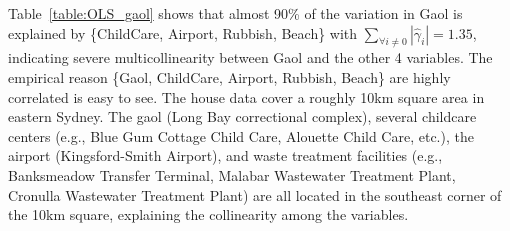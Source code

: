 \documentclass[11pt,review,authoryear]{elsarticle}
\begin{document}
Table~\ref{table:OLS_gaol} shows that almost 90\% of the variation in Gaol is explained by \{ChildCare, Airport, Rubbish, Beach\} with $\sum_{\forall i \neq 0} \left\vert \hat{\gamma}_i \right\vert = 1.35$, indicating severe multicollinearity between Gaol and the other 4 variables. The empirical reason \{Gaol, ChildCare, Airport, Rubbish, Beach\} are highly correlated is easy to see. The house data cover a roughly 10km square area in eastern Sydney. The gaol (Long Bay correctional complex), several childcare centers (e.g., Blue Gum Cottage Child Care, Alouette Child Care, etc.), the airport (Kingsford-Smith Airport), and waste treatment facilities (e.g., Banksmeadow Transfer Terminal, Malabar Wastewater Treatment Plant, Cronulla Wastewater Treatment Plant) are all located in the southeast corner of the 10km square, explaining the collinearity among the variables.
\end{document}
